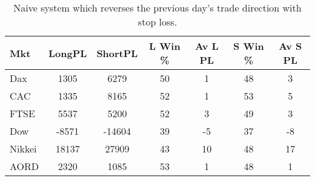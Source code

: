\begin{table}[ht]
\centering
\caption[Naive Following System.]{Naive system which reverses the previous day's trade direction with stop loss.} 
\label{tab:n_rev_results_sl}
\begin{tabular}{lcccccc}
  \toprule Mkt & LongPL & ShortPL & L Win \% & Av L PL & S Win \% & Av S PL \\ 
  \midrule Dax & 1305 & 6279 & 50 & 1 & 48 & 3 \\ 
  CAC & 1335 & 8165 & 52 & 1 & 53 & 5 \\ 
  FTSE & 5537 & 5200 & 52 & 3 & 49 & 3 \\ 
  Dow & -8571 & -14604 & 39 & -5 & 37 & -8 \\ 
  Nikkei & 18137 & 27909 & 43 & 10 & 48 & 17 \\ 
  AORD & 2320 & 1085 & 53 & 1 & 48 & 1 \\ 
   \bottomrule \end{tabular}
\end{table}
